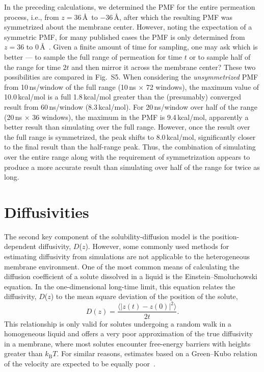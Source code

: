 \par In the preceding calculations, we determined the PMF for the entire permeation process, i.e., from $z=36$\,\AA~to $-36$\,\AA, after which the resulting PMF was symmetrized about the membrane center.  However, noting the expectation of a symmetric PMF, for many published cases the PMF is only determined from $z=36$ to 0\,\AA~\cite{Marrink1996,Bemporad2004,Holland2012}.  Given a finite amount of time for sampling, one may ask which is better --- to sample the full range of permeation for time $t$ or to sample half of the range for time $2t$ and then mirror it across the membrane center?  These two possibilities are compared in Fig.~S5.  When considering the {\it unsymmetrized} PMF from 10\,ns/window of the full range (10\,ns $\times$ 72 windows), the maximum value of 10.0\,kcal/mol is a full 1.8\,kcal/mol greater than the (presumably) converged result from 60\,ns/window (8.3\,kcal/mol).  For 20\,ns/window over half of the range (20\,ns $\times$ 36 windows), the maximum in the PMF is 9.4\,kcal/mol, apparently a better result than simulating over the full range.  However, once the result over the full range is symmetrized, the peak shifts to 8.0\,kcal/mol, significantly closer to the final result than the half-range peak.  Thus, the combination of simulating over the entire range along with the requirement of symmetrization appears to produce a more accurate result than simulating over half of the range for twice as long.


\section{Diffusivities}
\par The second key component of the solubility-diffusion model is the position-dependent diffusivity, $D$($z$). However, some commonly used methods for estimating diffusivity from simulations are not applicable to the heterogeneous membrane environment. One of the most common means of calculating the diffusion coefficient of a solute dissolved in a liquid is the Einstein--Smoluchowski equation. In the one-dimensional long-time limit, this equation relates the diffusivity, $D$($z$) to the mean square deviation of the position of the solute,
\begin{equation}
D(z) = \frac{\langle \left| z(t) - z(0) \right|^2 \rangle}{2t}.
\label{eq:einstein-smoluchowski}
\end{equation}
This relationship is only valid for solutes undergoing a random walk in a homogeneous liquid and offers a very poor approximation of the true diffusivity in a membrane, where most solutes encounter free-energy barriers with heights greater than $k_\mathrm{B} T$. For similar reasons, estimates based on a Green--Kubo relation of the velocity are expected to be equally poor~\cite{Mamonov2006}.

